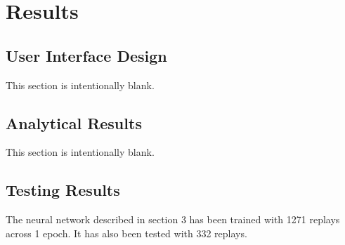 \chapter{Results}



\section{User Interface Design}

This section is intentionally blank.




\section{Analytical Results}

This section is intentionally blank.





\section{Testing Results}

The neural network described in section 3 has been trained with 1271 replays across 1 epoch. It has also been tested with 332 replays.

